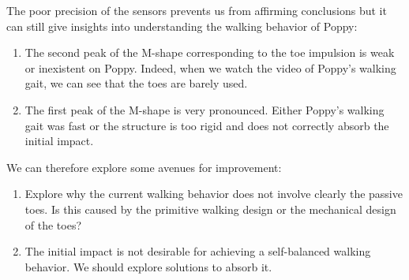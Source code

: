 \begin{figure}[!h]
\centering
    \newline
    \caption{}
    \label{fig:human_GRF}
\end{figure}


The poor precision of the sensors prevents us from affirming conclusions but it can still give insights into understanding the walking behavior of Poppy:
\begin{enumerate}
    \item The second peak of the M-shape corresponding to the toe impulsion is weak or inexistent on Poppy. Indeed, when we watch the video of Poppy’s walking gait, we can see that the toes are barely used.
    \item The first peak of the M-shape is very pronounced. Either Poppy’s walking gait was fast or the structure is too rigid and does not correctly absorb the initial impact.
\end{enumerate}

We can therefore explore some avenues for improvement:
\begin{enumerate}
    \item Explore why the current walking behavior does not involve clearly the passive toes. Is this caused by the primitive walking design or the mechanical design of the toes?
    \item The initial impact is not desirable for achieving a self-balanced walking behavior. We should explore solutions to absorb it.
\end{enumerate}


